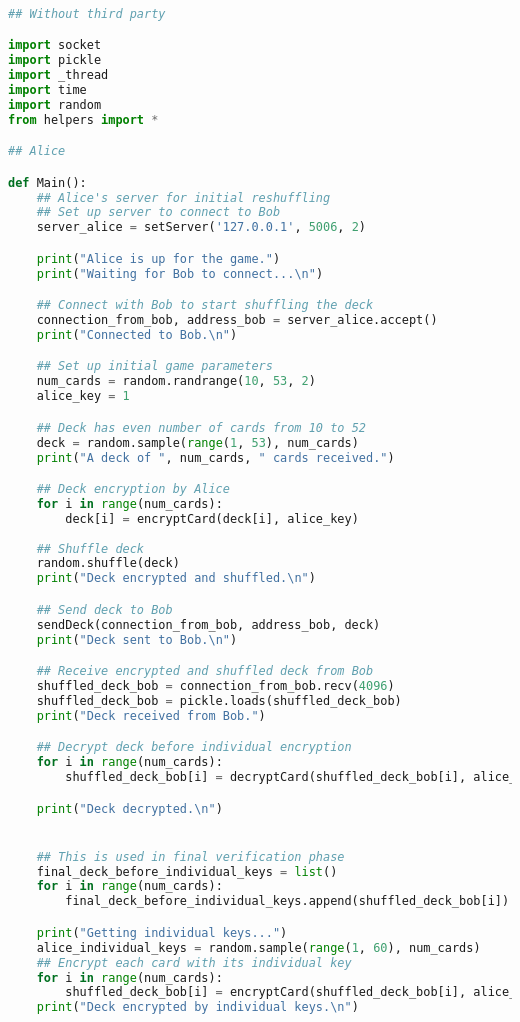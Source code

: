 \documentclass{article}
\begin{document}
\begin{lstlisting}[language=Python, caption=CVM.py]

## Without third party

import socket
import pickle
import _thread
import time
import random
from helpers import *

## Alice

def Main():
    ## Alice's server for initial reshuffling
    ## Set up server to connect to Bob
    server_alice = setServer('127.0.0.1', 5006, 2)

    print("Alice is up for the game.")
    print("Waiting for Bob to connect...\n")

    ## Connect with Bob to start shuffling the deck
    connection_from_bob, address_bob = server_alice.accept()
    print("Connected to Bob.\n")

    ## Set up initial game parameters
    num_cards = random.randrange(10, 53, 2)
    alice_key = 1

    ## Deck has even number of cards from 10 to 52
    deck = random.sample(range(1, 53), num_cards)
    print("A deck of ", num_cards, " cards received.")

    ## Deck encryption by Alice
    for i in range(num_cards):
        deck[i] = encryptCard(deck[i], alice_key)
    
    ## Shuffle deck    
    random.shuffle(deck)
    print("Deck encrypted and shuffled.\n")

    ## Send deck to Bob
    sendDeck(connection_from_bob, address_bob, deck)
    print("Deck sent to Bob.\n")

    ## Receive encrypted and shuffled deck from Bob
    shuffled_deck_bob = connection_from_bob.recv(4096)
    shuffled_deck_bob = pickle.loads(shuffled_deck_bob)
    print("Deck received from Bob.")

    ## Decrypt deck before individual encryption
    for i in range(num_cards):
        shuffled_deck_bob[i] = decryptCard(shuffled_deck_bob[i], alice_key)

    print("Deck decrypted.\n")


    ## This is used in final verification phase
    final_deck_before_individual_keys = list()
    for i in range(num_cards):
        final_deck_before_individual_keys.append(shuffled_deck_bob[i])

    print("Getting individual keys...")
    alice_individual_keys = random.sample(range(1, 60), num_cards)
    ## Encrypt each card with its individual key
    for i in range(num_cards):
        shuffled_deck_bob[i] = encryptCard(shuffled_deck_bob[i], alice_individual_keys[i])
    print("Deck encrypted by individual keys.\n")


\end{lstlisting}
\end{document}
